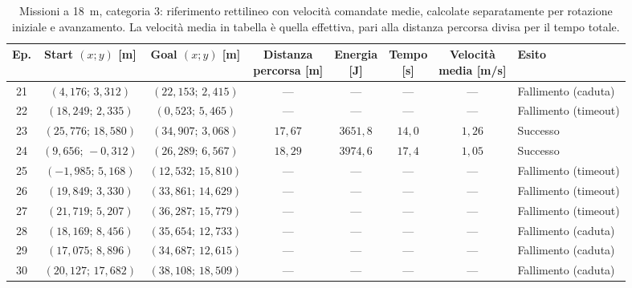 \begin{table}[H]
\centering
\caption{Missioni a 18~m, categoria 3: riferimento rettilineo con velocità comandate medie, calcolate separatamente per rotazione iniziale e avanzamento. La velocità media in tabella è quella effettiva, pari alla distanza percorsa divisa per il tempo totale.}
\label{tab:straight-line-command-mean-18m-cat3}
\begingroup
\fontsize{9}{11}\selectfont
\setlength{\tabcolsep}{2.5pt}
\renewcommand{\arraystretch}{1.2}
\begin{tabular}{@{}c cc cccc l@{}}
\toprule
Ep. & \shortstack{Start $(x;y)$\\{}[m]} & \shortstack{Goal $(x;y)$\\{}[m]} & \shortstack{Distanza\\percorsa [m]} & \shortstack{Energia\\{}[J]} & \shortstack{Tempo\\{}[s]} & \shortstack{Velocità\\media [m/s]} & Esito \\
\midrule
21 & $(4{,}176;\,3{,}312)$ & $(22{,}153;\,2{,}415)$ & --- & --- & --- & --- & Fallimento (caduta) \\
22 & $(18{,}249;\,2{,}335)$ & $(0{,}523;\,5{,}465)$ & --- & --- & --- & --- & Fallimento (timeout) \\
23 & $(25{,}776;\,18{,}580)$ & $(34{,}907;\,3{,}068)$ & $17{,}67$ & $3651{,}8$ & $14{,}0$ & $1{,}26$ & Successo \\
24 & $(9{,}656;\,-0{,}312)$ & $(26{,}289;\,6{,}567)$ & $18{,}29$ & $3974{,}6$ & $17{,}4$ & $1{,}05$ & Successo \\
25 & $(-1{,}985;\,5{,}168)$ & $(12{,}532;\,15{,}810)$ & --- & --- & --- & --- & Fallimento (timeout) \\
26 & $(19{,}849;\,3{,}330)$ & $(33{,}861;\,14{,}629)$ & --- & --- & --- & --- & Fallimento (timeout) \\
27 & $(21{,}719;\,5{,}207)$ & $(36{,}287;\,15{,}779)$ & --- & --- & --- & --- & Fallimento (timeout) \\
28 & $(18{,}169;\,8{,}456)$ & $(35{,}654;\,12{,}733)$ & --- & --- & --- & --- & Fallimento (caduta) \\
29 & $(17{,}075;\,8{,}896)$ & $(34{,}687;\,12{,}615)$ & --- & --- & --- & --- & Fallimento (caduta) \\
30 & $(20{,}127;\,17{,}682)$ & $(38{,}108;\,18{,}509)$ & --- & --- & --- & --- & Fallimento (caduta) \\
\bottomrule
\end{tabular}
\endgroup
\end{table}

